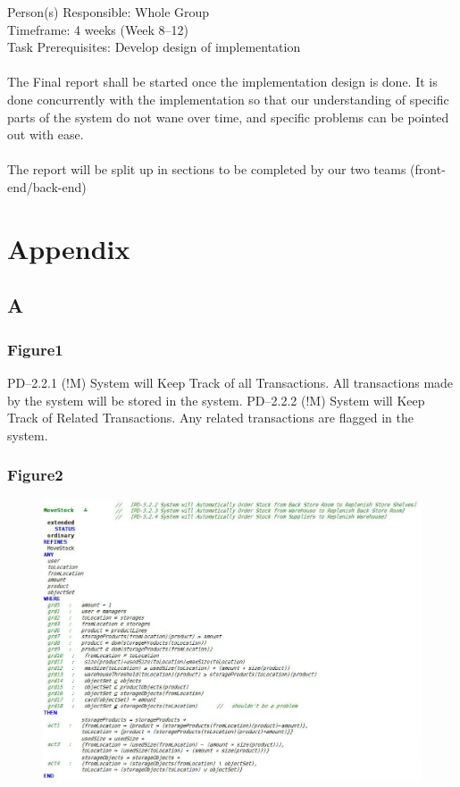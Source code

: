 Person(s) Responsible: Whole Group
 \\ Timeframe: 4 weeks (Week 8--12)
 \\ Task Prerequisites: Develop design of implementation
 \\ \\ The Final report shall be started once the implementation design is done. It is done concurrently with the implementation so that our understanding of specific parts of the system do not wane over time, and specific problems can be pointed out with ease.
 \\ \\ The report will be split up in sections to be completed by our two teams (front-end\slash back-end) 

 \pagebreak 

\chapter{Appendix}
\label{appendix}

\section{A}
\label{a}

\subsection{Figure1}
\label{figure1}

PD--2.2.1 (!M) System will Keep Track of all Transactions.
All transactions made by the system will be stored in the system.
PD--2.2.2 (!M) System will Keep Track of Related Transactions.
Any related transactions are flagged in the system.

\subsection{Figure2}
\label{figure2}

\begin{figure}[htbp]
\centering
\includegraphics[keepaspectratio,width=\textwidth,height=0.75\textheight]{1.jpg}
\label{}
\end{figure}


